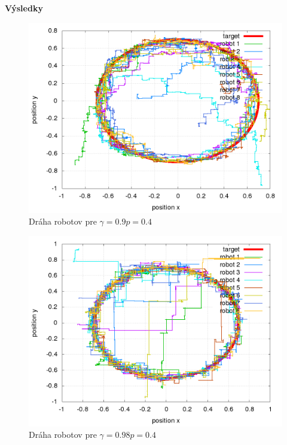 \documentclass[xcolor=dvipsnames]{beamer}
\begin{document}
\begin{frame}{\bf Výsledky}


  \begin{minipage}{.5\textwidth}

    \begin{figure}[!htb]
    \centering
    \includegraphics[scale=.2]{../../results_q_learning/nano_q_learning/result_04_03/robot_path.png}
    \caption{Dráha robotov pre $\gamma = 0.9 p = 0.4$}
    \label{img:nano_q_result_04_3_path}
    \end{figure}


  \end{minipage}%
  \begin{minipage}{.5\textwidth}

    \begin{figure}[!htb]
    \centering
    \includegraphics[scale=.2]{../../results_q_learning/nano_q_learning/result_04_04/robot_path.png}
    \caption{Dráha robotov pre $\gamma = 0.98 p = 0.4$}
    \label{img:nano_q_result_04_4_path}
    \end{figure}

  \end{minipage}

\end{frame}
\end{document}
